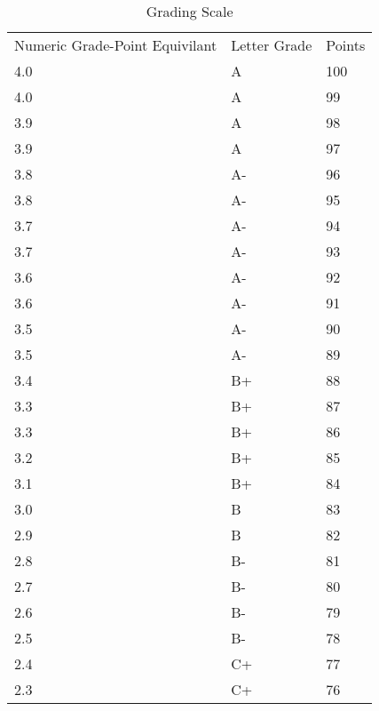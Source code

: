\documentclass[11pt,]{article}
\begin{document}
\begin{table}[]
\centering
\caption{Grading Scale}
\label{my-label}
\begin{tabular}{lll}
Numeric Grade-Point Equivilant & Letter Grade & Points \\
4.0                           & A            & 100    \\
4.0                           & A            & 99     \\
3.9                           & A            & 98     \\
3.9                           & A            & 97     \\
3.8                           & A-           & 96     \\
3.8                           & A-           & 95     \\
3.7                           & A-           & 94     \\
3.7                           & A-           & 93     \\
3.6                           & A-           & 92     \\
3.6                           & A-           & 91     \\
3.5                           & A-           & 90     \\
3.5                           & A-           & 89     \\
3.4                           & B+           & 88     \\
3.3                           & B+           & 87     \\
3.3                           & B+           & 86     \\
3.2                           & B+           & 85     \\
3.1                           & B+           & 84     \\
3.0                           & B            & 83     \\
2.9                           & B            & 82     \\
2.8                           & B-           & 81     \\
2.7                           & B-           & 80     \\
2.6                           & B-           & 79     \\
2.5                           & B-           & 78     \\
2.4                           & C+           & 77     \\
2.3                           & C+           & 76     \\

\end{tabular}
\end{table}
\end{document}
